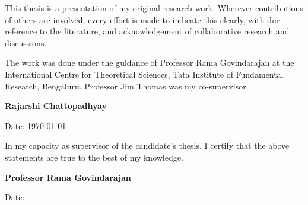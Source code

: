   \vspace{2.5cm}
  
  \setlength{\parindent}{1.5em}
  
  \noindent This thesis is a presentation of my original research work. Wherever
  contributions of others are involved, every effort is made to indicate
  this clearly, with due reference to the literature, and acknowledgement
  of collaborative research and discussions.
  
  \vspace{1em}
  
  \noindent The work was done under the guidance of Professor Rama Govindarajan at
  the International Centre for Theoretical Sciences, Tata Institute of
  Fundamental Research, Bengaluru. Professor Jim Thomas was my  co-supervisor.
  
  \vspace{3cm}
  
  {\raggedleft
  \textbf{Rajarshi Chattopadhyay}\par
  }
  \hfill Date: \today
  
  \vspace{2.5cm}
  
  \noindent In my capacity as supervisor of the candidate's thesis, I certify that
  the above statements are true to the best of my knowledge.
  
  \vspace{3cm}
  
  \noindent\textbf{Professor Rama Govindarajan}
  
  \noindent Date: 
  
  \clearpage
  
    
  \newpage
  \thispagestyle{empty}   %
  \vspace*{0.35\textheight} %




